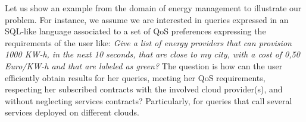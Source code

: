 \documentclass[12pt,a4paper,oneside]{report}
\begin{document}







Let us show an example from the domain of energy management to illustrate our problem. 
For instance, we assume we are interested in queries expressed in an SQL-like language associated to a set of QoS preferences expressing the requirements of the user like: \textit{Give a list of energy providers that can provision 1000 KW-h, in the next 10 seconds, that are close to my city, with a cost of 0,50 Euro/KW-h and that are labeled as green?} The question is how can the user efficiently obtain results for her queries, meeting her QoS requirements, respecting her subscribed contracts with the involved cloud provider(s), and without neglecting services contracts? 
Particularly, for queries that call several services deployed on different clouds.
\end{document}

